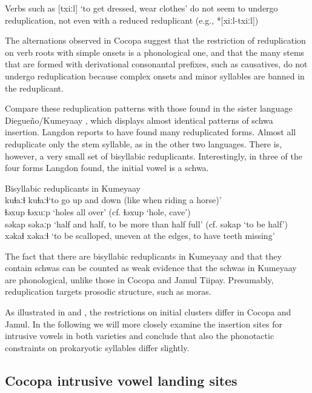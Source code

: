 \documentclass[output=paper,colorlinks,citecolor=brown]{langscibook}
\begin{document}
Verbs such as [txiːl] ‘to get dressed, wear clothes’ do not seem to undergo reduplication, not even with a reduced reduplicant (e.g., *[xiːl-txiːl])

The alternations observed in Cocopa  suggest that the restriction of reduplication on verb roots with simple onsets is a phonological one, and that the many stems that are formed with derivational consonantal prefixes, such as causatives, do not undergo reduplication because complex onsets and minor syllables are banned in the reduplicant.  

Compare these reduplication patterns with those found in the sister language Diegueño/Kumeyaay \citep{Langdon1966}, which displays almost identical patterns of schwa insertion. Langdon reports to have found many reduplicated forms. Almost all reduplicate only the stem syllable, as in the other two languages. There is, however, a very small set of bisyllabic reduplicants. Interestingly, in three of the four forms Langdon found, the initial vowel is a schwa.

\TabPositions{2.2cm,6cm}
\begin{exe}
    \ex Bisyllabic reduplicants in Kumeyaay \citep[202]{Langdon1966}\\
    kuɬaːɬ kuɬaːɬ\tab    ‘to go up and down (like when riding a horse)’\\
      ɬəxup ɬəxuːp \tab    ‘holes all over’ (cf. ɬəxup  ‘hole, cave’)\\
      səkap səkaːp  \tab  ‘half and half, to be more than half full’ (cf. səkap ‘to be half’)\\
      xəkaɬ xəkaːɬ \tab   ‘to be scalloped, uneven at the edges, to have teeth missing’
\end{exe}

The fact that there are bisyllabic reduplicants in Kumeyaay and that they contain schwas can be counted as weak evidence that the schwas in Kumeyaay are phonological, unlike those in Cocopa and Jamul Tiipay. Presumably, reduplication targets prosodic structure, such as moras.

As illustrated in  and , the restrictions on initial clusters differ in Cocopa and Jamul. In the following we will more closely examine the insertion sites for intrusive vowels in both varieties and conclude that also the phonotactic constraints on prokaryotic syllables differ slightly.

\subsection{Cocopa intrusive vowel landing sites}\label{cocopa}
\end{document}
